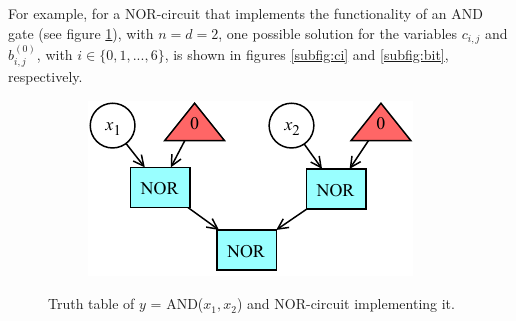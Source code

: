 \documentclass[letterpaper,10pt]{article}
\begin{document}
For example, for a NOR-circuit that implements the functionality of an AND gate (see figure \ref{fig:original}), with $n = d = 2$, one possible solution for the variables $c_{i,j}$ and $b_{i,j}^{(0)}$, with $i \in \{0,1,...,6\}$, is shown in figures \ref{subfig:ci} and \ref{subfig:bit}, respectively.
\begin{figure}[hbtp]
    \centering
    \begin{subfigure}[b]{0.45\textwidth}
    \end{subfigure}\hspace{-0.2\textwidth}
    \begin{subfigure}[b]{0.45\textwidth}
        \includegraphics[width=\textwidth]{circuit.pdf}
    \end{subfigure}
    \caption{Truth table of $y$ = AND($x_1,x_2$) and NOR-circuit implementing it.}
    \label{fig:original}
\end{figure}
\end{document}
